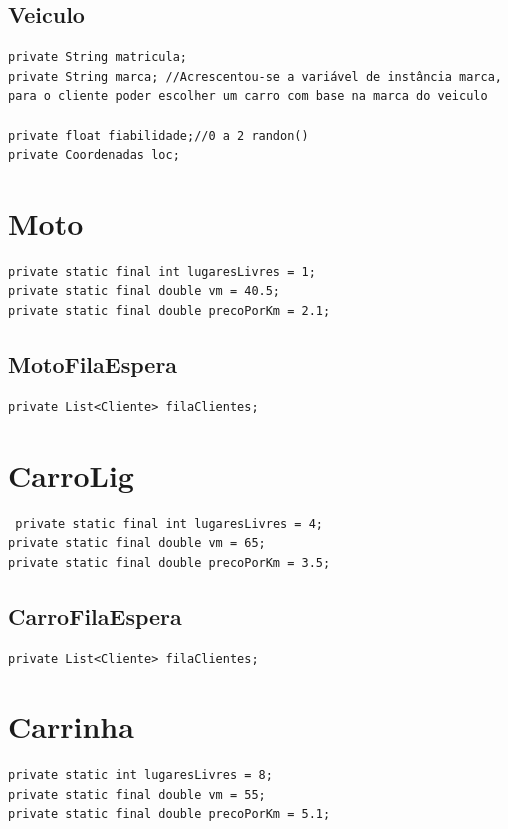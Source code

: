\subsection{Veiculo}

\begin{verbatim}
private String matricula; 
private String marca; //Acrescentou-se a variável de instância marca, 
para o cliente poder escolher um carro com base na marca do veiculo

private float fiabilidade;//0 a 2 randon()
private Coordenadas loc;
\end{verbatim}

\section{Moto}
\begin{verbatim}
private static final int lugaresLivres = 1;
private static final double vm = 40.5; 
private static final double precoPorKm = 2.1;
\end{verbatim}

\subsection{MotoFilaEspera}
\begin{verbatim}
private List<Cliente> filaClientes;
\end{verbatim}

\section{CarroLig}

\begin{verbatim}
 private static final int lugaresLivres = 4;
private static final double vm = 65; 
private static final double precoPorKm = 3.5;
\end{verbatim}

\subsection{CarroFilaEspera}
\begin{verbatim}
private List<Cliente> filaClientes;
\end{verbatim}

\section{Carrinha}

\begin{verbatim}
private static int lugaresLivres = 8;
private static final double vm = 55;
private static final double precoPorKm = 5.1;
\end{verbatim}

